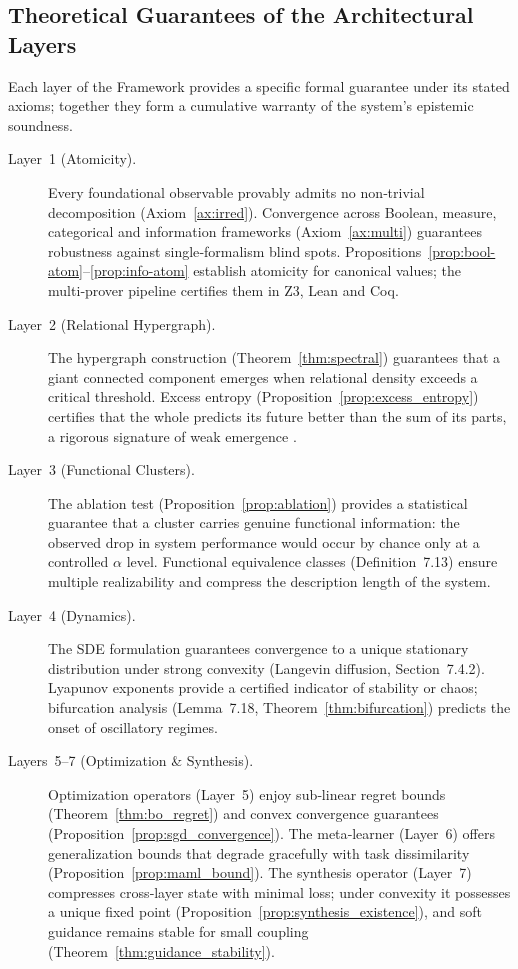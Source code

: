 \subsection{Theoretical Guarantees of the Architectural Layers}
\label{subsec:guarantees}

Each layer of the \Apeiron{} Framework provides a specific formal guarantee under its stated axioms; together they form a cumulative warranty of the system's epistemic soundness.

\begin{description}
  \item[Layer~1 (Atomicity).] Every foundational observable provably admits no non‑trivial decomposition (Axiom~\ref{ax:irred}). Convergence across Boolean, measure, categorical and information frameworks (Axiom~\ref{ax:multi}) guarantees robustness against single‑formalism blind spots. Propositions~\ref{prop:bool-atom}--\ref{prop:info-atom} establish atomicity for canonical values; the multi‑prover pipeline certifies them in Z3, Lean and Coq.

  \item[Layer~2 (Relational Hypergraph).] The hypergraph construction (Theorem~\ref{thm:spectral}) guarantees that a giant connected component emerges when relational density exceeds a critical threshold. Excess entropy (Proposition~\ref{prop:excess_entropy}) certifies that the whole predicts its future better than the sum of its parts, a rigorous signature of weak emergence \cite{bedau1997}.

  \item[Layer~3 (Functional Clusters).] The ablation test (Proposition~\ref{prop:ablation}) provides a statistical guarantee that a cluster carries genuine functional information: the observed drop in system performance would occur by chance only at a controlled $\alpha$ level. Functional equivalence classes (Definition~7.13) ensure multiple realizability and compress the description length of the system.

  \item[Layer~4 (Dynamics).] The SDE formulation guarantees convergence to a unique stationary distribution under strong convexity (Langevin diffusion, Section~7.4.2). Lyapunov exponents provide a certified indicator of stability or chaos; bifurcation analysis (Lemma~7.18, Theorem~\ref{thm:bifurcation}) predicts the onset of oscillatory regimes.

  \item[Layers~5--7 (Optimization \& Synthesis).] Optimization operators (Layer~5) enjoy sub‑linear regret bounds (Theorem~\ref{thm:bo_regret}) and convex convergence guarantees (Proposition~\ref{prop:sgd_convergence}). The meta‑learner (Layer~6) offers generalization bounds that degrade gracefully with task dissimilarity (Proposition~\ref{prop:maml_bound}). The synthesis operator (Layer~7) compresses cross‑layer state with minimal loss; under convexity it possesses a unique fixed point (Proposition~\ref{prop:synthesis_existence}), and soft guidance remains stable for small coupling (Theorem~\ref{thm:guidance_stability}).


\end{description}
